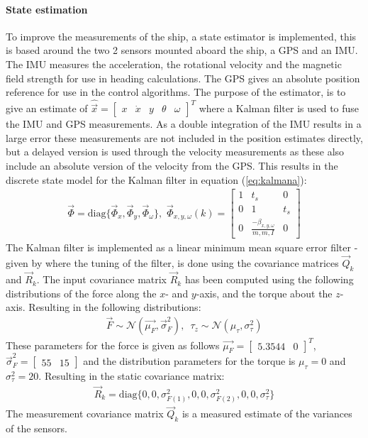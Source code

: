 \documentclass[a0,portrait]{a0poster}
\begin{document}
\begin{center}
{\paragraph{State estimation}
To improve the measurements of the ship, a state estimator is implemented, this is based around the two 2 sensors mounted aboard the ship, a GPS and an IMU. The IMU measures the acceleration, the rotational velocity and the magnetic field strength for use in heading calculations. The GPS gives an absolute position reference for use in the control algorithms. The purpose of the estimator, is to give an estimate of $\hat{\vec{x}} = \begin{bmatrix}x & \dot{x} & y & \theta & \omega\end{bmatrix}^T$ where a Kalman filter is used to fuse the IMU and GPS measurements. As a double integration of the IMU results in a large error these measurements are not included in the position estimates directly, but a delayed version is used through the velocity measurements as these also include an absolute version of the velocity from the GPS. This results in the discrete state model for the Kalman filter in equation (\ref{eq:kalmana}):
\begin{align}
\vec{\Phi} = \text{diag}\{\vec{\Phi} _x,\vec{\Phi} _y,\vec{\Phi} _\omega\},\,\, \vec{\Phi}_{x,y,\omega}(k) = \begin{bmatrix}
1 & t_s & 0\\
0 & 1 & t_s\\
0 & \frac{-\beta_{x,y,\omega}}{m,m,I} & 0
\end{bmatrix}
\label{eq:kalmana}
\end{align}
The Kalman filter is implemented as a linear minimum mean square error filter - given by \cite{grewal} where the tuning of the filter, is done using the covariance matrices $\vec{Q}_k$ and $\vec{R}_k$. The input covariance matrix $\vec{R}_k$ has been computed using the following distributions of the force along the $x$- and $y$-axis, and the torque about the $z$-axis. Resulting in the following distributions:
\begin{align}
\vec{F} \sim \mathcal{N}(\vec{\mu_F},\vec{\sigma}^2_F),\,\,\, \tau_z \sim \mathcal{N}(\mu_{\tau},\sigma^2_{\tau})
\end{align}
These parameters for the force is given as follows $\vec{\mu_F} = \begin{bmatrix}5.3544 & 0\end{bmatrix}^T$, $\vec{\sigma}^2_F = \begin{bmatrix}55 & 15\end{bmatrix}$ and the distribution parameters for the torque is $\mu_{\tau} = 0$ and $\sigma^2_{\tau} = 20$. Resulting in the static covariance matrix:
\begin{align}
\vec{R}_k = \text{diag}\{0,0,\sigma^2_{F(1)},0,0,\sigma^2_{F(2)},0,0,\sigma^2_\tau\}
\end{align}
The measurement covariance matrix $\vec{Q}_k$ is a measured estimate of the variances of the sensors.
}
\col{
}
\end{center}
\end{document}
